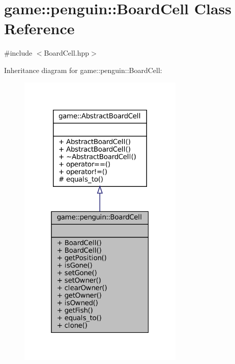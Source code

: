 \hypertarget{classgame_1_1penguin_1_1_board_cell}{}\section{game\+:\+:penguin\+:\+:Board\+Cell Class Reference}
\label{classgame_1_1penguin_1_1_board_cell}


{\ttfamily \#include $<$Board\+Cell.\+hpp$>$}



Inheritance diagram for game\+:\+:penguin\+:\+:Board\+Cell\+:
\nopagebreak
\begin{figure}[H]
\begin{center}
\leavevmode
\includegraphics[width=223pt]{classgame_1_1penguin_1_1_board_cell__inherit__graph}
\end{center}
\end{figure}


